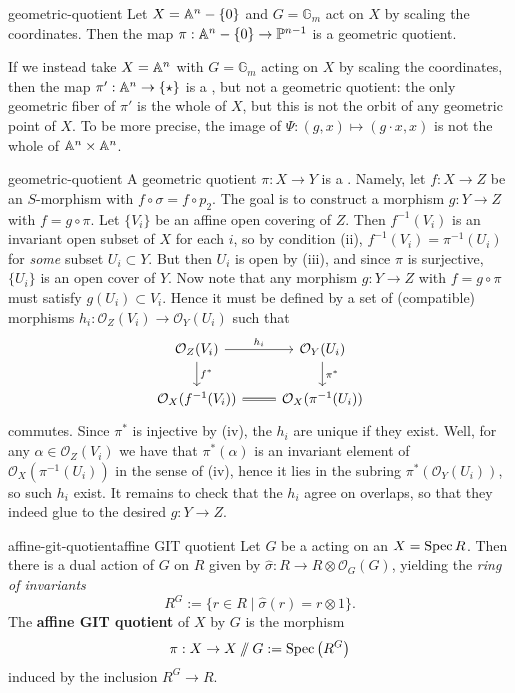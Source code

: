 \begin{example}{geometric-quotient}
    Let $X = \AA^n - \{ 0 \}$ and $G = \mathbb{G}_m$ act on $X$ by scaling the coordinates. Then the map $\pi : \AA^n - \{ 0 \} \to \PP^{n - 1}$ is a geometric quotient.
    
    If we instead take $X = \AA^n$ with $G = \mathbb{G}_m$ acting on $X$ by scaling the coordinates, then the map $\pi' : \AA^n \to \{ \star \}$ is a , but not a geometric quotient: the only geometric fiber of $\pi'$ is the whole of $X$, but this is not the orbit of any geometric point of $X$. To be more precise, the image of $\Psi : (g, x) \mapsto (g \cdot x, x)$ is not the whole of $\AA^n \times \AA^n$.
\end{example}

\begin{example}{geometric-quotient}
    A geometric quotient $\pi : X \to Y$ is a . Namely, let $f : X \to Z$ be an $S$-morphism with $f \circ \sigma = f \circ p_2$. The goal is to construct a morphism $g : Y \to Z$ with $f = g \circ \pi$. Let $\{ V_i \}$ be an affine open covering of $Z$. Then $f^{-1}(V_i)$ is an invariant open subset of $X$ for each $i$, so by condition (ii), $f^{-1}(V_i) = \pi^{-1}(U_i)$ for \textit{some} subset $U_i \subset Y$. But then $U_i$ is open by (iii), and since $\pi$ is surjective, $\{ U_i \}$ is an open cover of $Y$. Now note that any morphism $g : Y \to Z$ with $f = g \circ \pi$ must satisfy $g(U_i) \subset V_i$. Hence it must be defined by a set of (compatible) morphisms $h_i : \mathcal{O}_Z(V_i) \to \mathcal{O}_Y(U_i)$ such that
    \[ \begin{tikzcd} \mathcal{O}_Z(V_i) \arrow{r}{h_i} \arrow{d}{f^*} & \mathcal{O}_Y(U_i) \arrow{d}{\pi^*} \\ \mathcal{O}_X(f^{-1}(V_i)) \arrow[equal]{r} & \mathcal{O}_X(\pi^{-1}(U_i)) \end{tikzcd} \]
    commutes. Since $\pi^*$ is injective by (iv), the $h_i$ are unique if they exist. Well, for any $\alpha \in \mathcal{O}_Z(V_i)$ we have that $\pi^*(\alpha)$ is an invariant element of $\mathcal{O}_X(\pi^{-1}(U_i))$ in the sense of (iv), hence it lies in the subring $\pi^*(\mathcal{O}_Y(U_i))$, so such $h_i$ exist.
    It remains to check that the $h_i$ agree on overlaps, so that they indeed glue to the desired $g : Y \to Z$.
\end{example}

\begin{topic}{affine-git-quotient}{affine GIT quotient}
    Let $G$ be a   acting on an  $X = \Spec R$. Then there is a dual action of $G$ on $R$ given by $\widehat{\sigma} : R \to R \otimes \mathcal{O}_G(G)$, yielding the \textit{ring of invariants}
    \[ R^G := \{ r \in R \mid \widehat{\sigma}(r) = r \otimes 1 \} . \]
    The \textbf{affine GIT quotient} of $X$ by $G$ is the morphism
    \[ \pi : X \to X \sslash G := \Spec\left(R^G\right) \]
    induced by the inclusion $R^G \to R$.
\end{topic}

